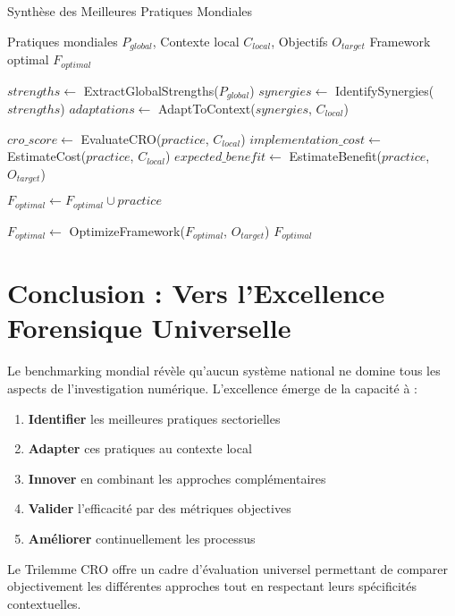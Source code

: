 \begin{algorithm}
\caption{Synthèse des Meilleures Pratiques Mondiales}
\begin{algorithmic}[1]
\REQUIRE Pratiques mondiales $P_{global}$, Contexte local $C_{local}$, Objectifs $O_{target}$
\ENSURE Framework optimal $F_{optimal}$

\STATE $strengths \leftarrow$ ExtractGlobalStrengths($P_{global}$)
\STATE $synergies \leftarrow$ IdentifySynergies($strengths$)
\STATE $adaptations \leftarrow$ AdaptToContext($synergies$, $C_{local}$)

    \STATE $cro\_score \leftarrow$ EvaluateCRO($practice$, $C_{local}$)
    \STATE $implementation\_cost \leftarrow$ EstimateCost($practice$, $C_{local}$)
    \STATE $expected\_benefit \leftarrow$ EstimateBenefit($practice$, $O_{target}$)
    
        \STATE $F_{optimal} \leftarrow F_{optimal} \cup practice$
    \ENDIF
\ENDFOR

\STATE $F_{optimal} \leftarrow$ OptimizeFramework($F_{optimal}$, $O_{target}$)
\RETURN $F_{optimal}$
\end{algorithmic}
\end{algorithm}

\section{Conclusion : Vers l'Excellence Forensique Universelle}

Le benchmarking mondial révèle qu'aucun système national ne domine tous les aspects de l'investigation numérique. L'excellence émerge de la capacité à :

\begin{enumerate}
\item \textbf{Identifier} les meilleures pratiques sectorielles
\item \textbf{Adapter} ces pratiques au contexte local
\item \textbf{Innover} en combinant les approches complémentaires
\item \textbf{Valider} l'efficacité par des métriques objectives
\item \textbf{Améliorer} continuellement les processus
\end{enumerate}

Le Trilemme CRO offre un cadre d'évaluation universel permettant de comparer objectivement les différentes approches tout en respectant leurs spécificités contextuelles.

